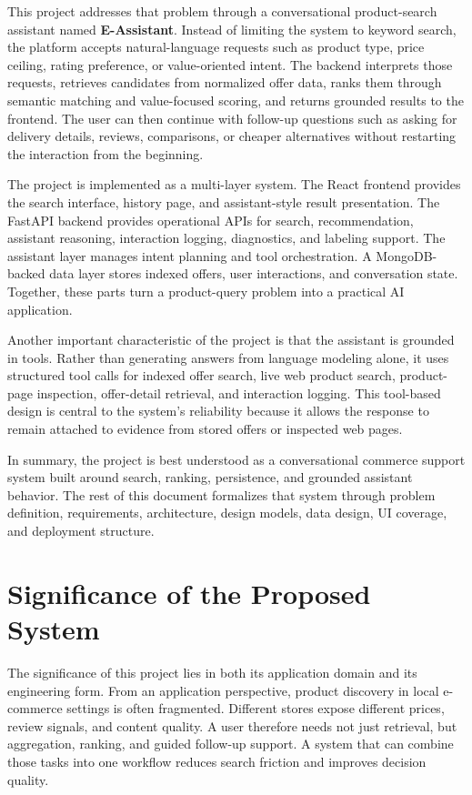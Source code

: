 \documentclass[12pt,a4paper,oneside]{report}
\begin{document}
This project addresses that problem through a conversational product-search assistant named \textbf{E-Assistant}. Instead of limiting the system to keyword search, the platform accepts natural-language requests such as product type, price ceiling, rating preference, or value-oriented intent. The backend interprets those requests, retrieves candidates from normalized offer data, ranks them through semantic matching and value-focused scoring, and returns grounded results to the frontend. The user can then continue with follow-up questions such as asking for delivery details, reviews, comparisons, or cheaper alternatives without restarting the interaction from the beginning.

The project is implemented as a multi-layer system. The React frontend provides the search interface, history page, and assistant-style result presentation. The FastAPI backend provides operational APIs for search, recommendation, assistant reasoning, interaction logging, diagnostics, and labeling support. The assistant layer manages intent planning and tool orchestration. A MongoDB-backed data layer stores indexed offers, user interactions, and conversation state. Together, these parts turn a product-query problem into a practical AI application.

Another important characteristic of the project is that the assistant is grounded in tools. Rather than generating answers from language modeling alone, it uses structured tool calls for indexed offer search, live web product search, product-page inspection, offer-detail retrieval, and interaction logging. This tool-based design is central to the system's reliability because it allows the response to remain attached to evidence from stored offers or inspected web pages.

In summary, the project is best understood as a conversational commerce support system built around search, ranking, persistence, and grounded assistant behavior. The rest of this document formalizes that system through problem definition, requirements, architecture, design models, data design, UI coverage, and deployment structure.

\section{Significance of the Proposed System}
The significance of this project lies in both its application domain and its engineering form. From an application perspective, product discovery in local e-commerce settings is often fragmented. Different stores expose different prices, review signals, and content quality. A user therefore needs not just retrieval, but aggregation, ranking, and guided follow-up support. A system that can combine those tasks into one workflow reduces search friction and improves decision quality.
\end{document}
